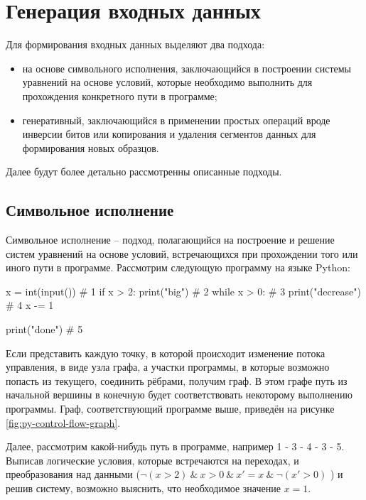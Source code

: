 \section{Генерация входных данных}

Для формирования входных данных выделяют два подхода:

\begin{itemize}
	
	\item на основе символьного исполнения, заключающийся в построении системы уравнений на основе условий, которые необходимо выполнить для прохождения конкретного пути в программе;
	
	\item генеративный, заключающийся в применении простых операций вроде инверсии битов или копирования и удаления сегментов данных для формирования новых образцов.
	
\end{itemize}

Далее будут более детально рассмотренны описанные подходы.

\subsection{Символьное исполнение}

Символьное исполнение -- подход, полагающийся на построение и решение систем уравнений на основе условий, встречающихся при прохождении того или иного пути в программе. Рассмотрим следующую программу на языке Python:
\begin{code}
x = int(input())      # 1
if x > 2:
    print("big")      # 2
while x > 0:          # 3
   print("decrease")  # 4
   x -= 1

print("done")         # 5
\end{code}

Если представить каждую точку, в которой происходит изменение потока управления, в виде узла графа, а участки программы, в которые возможно попасть из текущего, соединить рёбрами, получим граф. В этом графе путь из начальной вершины в конечную будет соответствовать некоторому выполнению программы. Граф, соответствующий программе выше, приведён на рисунке \ref{fig:py-control-flow-graph}.

Далее, рассмотрим какой-нибудь путь в программе, например 1 - 3 - 4 - 3 - 5. Выписав логические условия, которые встречаются на переходах, и преобразования над данными ($\neg (x > 2) \ \& \ x > 0 \ \& \ x'=x \ \& \ \neg (x'>0) $ ) и решив систему, возможно выяснить, что необходимое значение $x = 1$.

